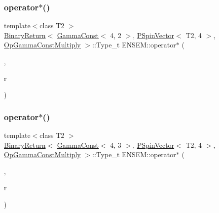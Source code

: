 \subsubsection{\texorpdfstring{operator$\ast$()}{operator*()}\hspace{0.1cm}{\footnotesize\ttfamily [3/32]}}
{\footnotesize\ttfamily template$<$class T2 $>$ \\
\mbox{\hyperlink{structENSEM_1_1BinaryReturn}{Binary\+Return}}$<$ \mbox{\hyperlink{classENSEM_1_1GammaConst}{Gamma\+Const}}$<$ 4, 2 $>$, \mbox{\hyperlink{classENSEM_1_1PSpinVector}{P\+Spin\+Vector}}$<$ T2, 4 $>$, \mbox{\hyperlink{structENSEM_1_1OpGammaConstMultiply}{Op\+Gamma\+Const\+Multiply}} $>$\+::Type\+\_\+t E\+N\+S\+E\+M\+::operator$\ast$ (\begin{DoxyParamCaption}\item[{const \mbox{\hyperlink{classENSEM_1_1GammaConst}{Gamma\+Const}}$<$ 4, 2 $>$ \&}]{,  }\item[{const \mbox{\hyperlink{classENSEM_1_1PSpinVector}{P\+Spin\+Vector}}$<$ T2, 4 $>$ \&}]{r }\end{DoxyParamCaption})\hspace{0.3cm}{\ttfamily [inline]}}

\mbox{\label{group__primspinvector_gade157607bce53ec9ffcde3e07f772efb}} 
\subsubsection{\texorpdfstring{operator$\ast$()}{operator*()}\hspace{0.1cm}{\footnotesize\ttfamily [4/32]}}
{\footnotesize\ttfamily template$<$class T2 $>$ \\
\mbox{\hyperlink{structENSEM_1_1BinaryReturn}{Binary\+Return}}$<$ \mbox{\hyperlink{classENSEM_1_1GammaConst}{Gamma\+Const}}$<$ 4, 3 $>$, \mbox{\hyperlink{classENSEM_1_1PSpinVector}{P\+Spin\+Vector}}$<$ T2, 4 $>$, \mbox{\hyperlink{structENSEM_1_1OpGammaConstMultiply}{Op\+Gamma\+Const\+Multiply}} $>$\+::Type\+\_\+t E\+N\+S\+E\+M\+::operator$\ast$ (\begin{DoxyParamCaption}\item[{const \mbox{\hyperlink{classENSEM_1_1GammaConst}{Gamma\+Const}}$<$ 4, 3 $>$ \&}]{,  }\item[{const \mbox{\hyperlink{classENSEM_1_1PSpinVector}{P\+Spin\+Vector}}$<$ T2, 4 $>$ \&}]{r }\end{DoxyParamCaption})\hspace{0.3cm}{\ttfamily [inline]}}

